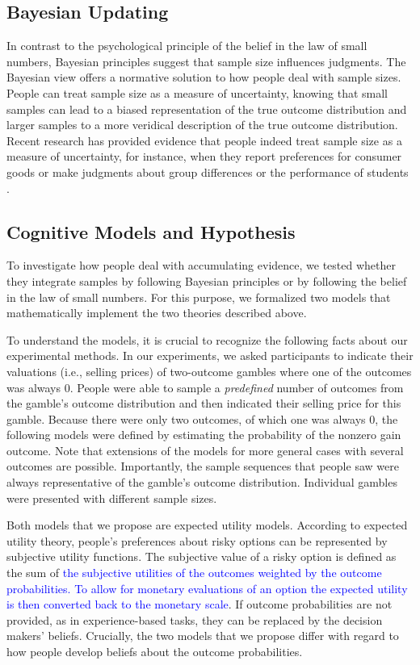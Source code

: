 \documentclass[a4paper, man, natbib, floatsintext]{apa6} %
\begin{document}
\subsection{Bayesian Updating}

In contrast to the psychological principle of the belief in the law of small numbers, Bayesian principles suggest that sample size influences judgments. 
The Bayesian view offers a normative solution to how people deal with sample sizes. People can treat sample size as a measure of uncertainty, knowing that small samples can lead to a biased representation of the true outcome distribution and larger samples to a more veridical description of the true outcome distribution. Recent research has provided evidence that people indeed treat sample size as a measure of uncertainty, for instance, when they report preferences for consumer goods \citep{DeMartino2017} or make judgments about group differences \citep{Obrecht2010} or the performance of students \citep{Fiedler2002}.

\subsection{Cognitive Models and Hypothesis}
To investigate how people deal with accumulating evidence, we tested whether they integrate samples by following Bayesian principles or by following the belief in the law of small numbers. For this purpose, we formalized two models that mathematically implement the two theories described above. 


To understand the models, it is crucial to recognize the following facts about our experimental methods. In our experiments, we asked participants to indicate their valuations (i.e., selling prices) of two-outcome gambles where one of the outcomes was always 0. People were able to sample a \textit{predefined} number of outcomes from the gamble's outcome distribution and then indicated their selling price for this gamble. Because there were only two outcomes, of which one was always 0, the following models were defined by estimating the probability of the nonzero gain outcome. Note that extensions of the models for more general cases with several outcomes are possible. Importantly, the sample sequences that people saw were always representative of the gamble's outcome distribution. Individual gambles were presented with different sample sizes. 

Both models that we propose are expected utility models. According to expected utility theory, people's preferences about risky options can be represented by subjective utility functions. The subjective value of a risky option is defined as the sum of \textcolor{blue}{the subjective utilities of the outcomes weighted by the outcome probabilities. To allow for monetary evaluations of an option the expected utility is then converted back to the monetary scale}. If outcome probabilities are not provided, as in experience-based tasks, they can be replaced by the decision makers' beliefs. Crucially, the two models that we propose differ with regard to how people develop beliefs about the outcome probabilities.
\end{document}
